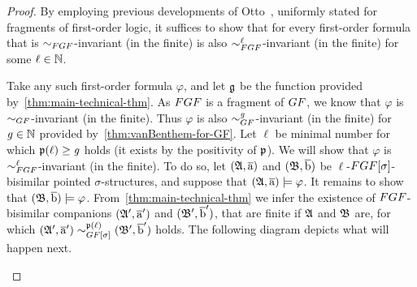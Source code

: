 \begin{proof}
By employing previous developments of Otto~\cite[Obs.~13]{Otto04}, uniformly stated for fragments of first-order logic, it suffices to show that for every first-order formula that is $\bisimto_{\FGF}$-invariant (in the finite) is also $\bisimto_{\FGF}^{\ell}$-invariant (in the finite) for some $\ell \in {\mathbb{N}}$.

Take any such first-order formula $\varphi$, and let $\mathfrak{g}$ be the function provided by~\cref{thm:main-technical-thm}. 
As $\FGF$ is a fragment of $\GF$, we know that $\varphi$ is $\bisimto_{\GF}$-invariant (in the finite).
Thus $\varphi$ is also $\bisimto_{\GF}^{\mathit{g}}$-invariant (in the finite) for $\mathit{g} \in {\mathbb{N}}$ provided by~\cref{thm:vanBenthem-for-GF}.
Let $\ell$ be minimal number for which $\mathfrak{p}(\ell) \geq \mathit{g}$ holds (it exists by the positivity of $\mathfrak{p}$).
We will show that $\varphi$ is $\bisimto_{\FGF}^{\ell}$-invariant (in the finite).
To do so, let $({\mathfrak{A}}, \overline{\mathrm{a}})$ and $({\mathfrak{B}}, \overline{\mathrm{b}})$ be $\ell$-$\FGF[\sigma]$-bisimilar pointed $\sigma$-structures, and suppose that $({\mathfrak{A}}, \overline{\mathrm{a}}) \models \varphi$. It remains to show that $({\mathfrak{B}}, \overline{\mathrm{b}}) \models \varphi$.
From~\cref{thm:main-technical-thm} we infer the existence of $\FGF$-bisimilar companions $({\mathfrak{A}}', \overline{\mathrm{a}}')$ and $({\mathfrak{B}}', \overline{\mathrm{b}}')$, that are finite if ${\mathfrak{A}}$ and ${\mathfrak{B}}$ are, for which $(\str{A}', \elemtuplea') \bisimto^{\homop(\ell)}_{\GF[\sigma]} (\str{B}', \elemtupleb')$ holds. 
The following diagram depicts what will happen next.
\begin{figure}[H]
  \centering
\end{figure}
\end{proof}
